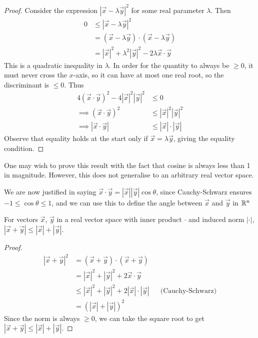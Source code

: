 \documentclass{../template/note}
\begin{document}
    \begin{proof}
        Consider the expression \(|\vec x - \lambda \vec y|^2\) for some real parameter \(\lambda\). Then
        \begin{align*}
            0 &\leq |\vec x - \lambda \vec y|^2 \\
            &= (\vec x - \lambda \vec y) \cdot (\vec x - \lambda \vec y) \\
            &= |\vec x|^2 + \lambda^2 |\vec y|^2 - 2 \lambda \vec x \cdot \vec y
        \end{align*}
        This is a quadratic inequality in \(\lambda\). In order for the quantity to always be \(\geq 0\), it must never cross the \(x\)-axis, so it can have at most one real root, so the discriminant is \(\leq 0\). Thus
        \begin{align*}
            4(\vec x \cdot \vec y)^2 - 4 |\vec x|^2 |\vec y|^2 &\leq 0 \\
            \implies (\vec x \cdot \vec y)^2 &\leq |\vec x|^2 |\vec y|^2 \\
            \implies |\vec x \cdot \vec y| &\leq |\vec x|\cdot|\vec y|
        \end{align*}
        Observe that equality holds at the start only if \(\vec x = \lambda \vec y\), giving the equality condition.
    \end{proof}
    
    \begin{remark}
        One may wish to prove this result with the fact that cosine is always less than 1 in magnitude. However, this does not generalise to an arbitrary real vector space.
    \end{remark}
    
    \begin{remark}
        We are now justified in saying \(\vec x \cdot \vec y = |\vec x||\vec y| \cos \theta\), since Cauchy-Schwarz ensures \(-1 \leq \cos \theta \leq 1\), and we can use this to define the angle between \(\vec x\) and \(\vec y\) in \(\mathbb R^n\)
    \end{remark}
    
    \begin{corollary}
        For vectors \(\vec x\), \(\vec y\) in a real vector space with inner product \(\cdot\) and induced norm \(|\cdot|\), \(|\vec x + \vec y| \leq |\vec x| + |\vec y|\).
    \end{corollary}
    
    \begin{proof}
        \begin{align*}
            |\vec x + \vec y|^2 &= (\vec x + \vec y) \cdot (\vec x + \vec y) \\
            &= |\vec x|^2 + |\vec y|^2 + 2 \vec x \cdot \vec y \\
            &\leq |\vec x|^2 + |\vec y|^2 + 2 |\vec x| \cdot |\vec y| && \text{(Cauchy-Schwarz)}\\
            &= (|\vec x| + |\vec y|)^2
        \end{align*}
        Since the norm is always \(\geq 0\), we can take the square root to get \(|\vec x + \vec y| \leq |\vec x| + |\vec y|\).
    \end{proof}
    
\end{document}
